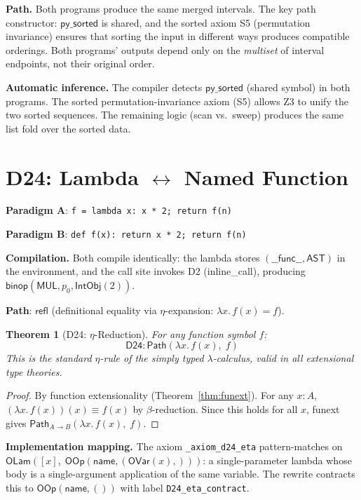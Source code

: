 \documentclass[11pt,a4paper]{report}
\theoremstyle{definition}
\theoremstyle{plain}
\newtheorem{theorem}[definition]{Theorem}
\newcommand{\Path}{\mathsf{Path}}
\begin{document}
\textbf{Path.}
Both programs produce the same merged intervals.  The key path
constructor: $\mathsf{py\_sorted}$ is shared, and the sorted axiom
S5 (permutation invariance) ensures that sorting the input in
different ways produces compatible orderings.  Both programs' outputs
depend only on the \emph{multiset} of interval endpoints, not their
original order.

\textbf{Automatic inference.}
The compiler detects $\mathsf{py\_sorted}$ (shared symbol) in both
programs.  The sorted permutation-invariance axiom (S5) allows Z3
to unify the two sorted sequences.  The remaining logic (scan vs.\
sweep) produces the same list fold over the sorted data.

\section{D24: Lambda $\leftrightarrow$ Named Function}
\label{sec:d24-eta}

\textbf{Paradigm A}: \texttt{f = lambda x: x * 2; return f(n)}

\textbf{Paradigm B}: \texttt{def f(x): return x * 2; return f(n)}

\textbf{Compilation.}
Both compile identically: the lambda stores
$(\mathsf{\_\_func\_\_}, \mathsf{AST})$ in the environment, and the
call site invokes D2 (inline\_call), producing
$\mathsf{binop}(\mathsf{MUL}, p_0, \mathsf{IntObj}(2))$.

\textbf{Path}: $\mathsf{refl}$ (definitional equality via
$\eta$-expansion: $\lambda x.\, f(x) = f$).

\begin{theorem}[D24: $\eta$-Reduction]
\label{thm:d24-eta}
For any function symbol $f$:
\[
  \mathsf{D24} : \Path\!\left(
    \lambda x.\, f(x),\; f
  \right)
\]
This is the standard $\eta$-rule of the simply typed
$\lambda$-calculus, valid in all extensional type theories.
\end{theorem}

\begin{proof}
By function extensionality (Theorem~\ref{thm:funext}).  For any
$x : A$, $(\lambda x.\, f(x))(x) \equiv f(x)$ by $\beta$-reduction.
Since this holds for all $x$, funext gives
$\Path_{A \to B}(\lambda x.\, f(x),\; f)$.
\end{proof}

\textbf{Implementation mapping.}
The axiom \texttt{\_axiom\_d24\_eta} pattern-matches on
$\mathsf{OLam}([x],\; \mathsf{OOp}(\mathsf{name},
(\mathsf{OVar}(x),)))$: a single-parameter lambda whose body is a
single-argument application of the same variable.  The rewrite
contracts this to $\mathsf{OOp}(\mathsf{name}, ())$ with label
\texttt{D24\_eta\_contract}.
\end{document}
